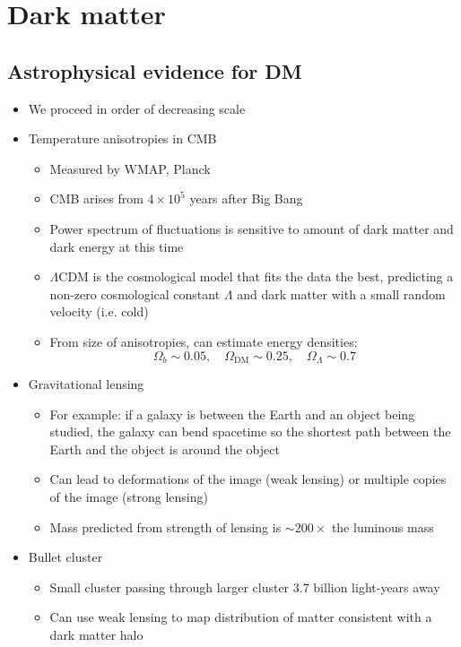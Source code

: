 \section{Dark matter}
\subsection{Astrophysical evidence for DM}
\begin{itemize}
  \item We proceed in order of decreasing scale
  \item Temperature anisotropies in CMB
  \begin{itemize}
    \item Measured by WMAP, Planck
    \item CMB arises from $4\times 10^5$ years after Big Bang
    \item Power spectrum of fluctuations is sensitive to amount of dark matter and dark energy at this time
    \item $\Lambda$CDM is the cosmological model that fits the data the best, predicting a non-zero cosmological constant $\Lambda$ and dark matter with a small random velocity (i.e. cold)
    \item From size of anisotropies, can estimate energy densities: 
    \begin{equation}
      \Omega_b \sim 0.05, \quad\Omega_\text{DM} \sim 0.25, \quad \Omega_{\Lambda} \sim 0.7
    \end{equation}
  \end{itemize}
  \item Gravitational lensing
  \begin{itemize}
    \item For example: if a galaxy is between the Earth and an object being studied, the galaxy can bend spacetime so the shortest path between the Earth and the object is around the object
    \item Can lead to deformations of the image (weak lensing) or multiple copies of the image (strong lensing)
    \item Mass predicted from strength of lensing is $\sim 200\times $ the luminous mass
  \end{itemize}
  \item Bullet cluster
  \begin{itemize}
    \item Small cluster passing through larger cluster 3.7 billion light-years away
    \item Can use weak lensing to map distribution of matter \thus consistent with a dark matter halo

\end{itemize}
\end{itemize}
